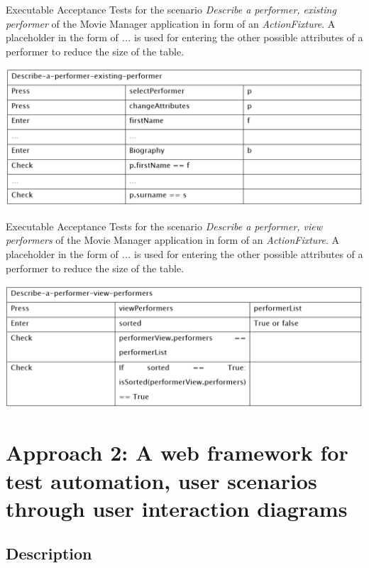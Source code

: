 \begin{table}[H]
	\caption{Executable Acceptance Tests for the scenario \textit{Describe a performer, existing performer} of the Movie Manager application in form of an \textit{ActionFixture}.
	A placeholder in the form of \textit{...} is used for entering the other possible attributes of a performer to reduce the size of the table.}
	\centering
	\includegraphics[width=.9\textwidth]{../images/ElAttarEATs2.png}	
	\label{fig:eats2-mm}
\end{table}

\begin{table}[H]
	\caption{Executable Acceptance Tests for the scenario \textit{Describe a performer, view performers} of the Movie Manager application in form of an \textit{ActionFixture}.
	A placeholder in the form of \textit{...} is used for entering the other possible attributes of a performer to reduce the size of the table.}
	\centering
	\includegraphics[width=.9\textwidth]{../images/ElAttarEATs3.png}
	\label{fig:eats3-mm}
\end{table}


\section{Approach 2: A web framework for test automation, user scenarios through user interaction diagrams}
\label{sec:longo}

\subsection{Description}

